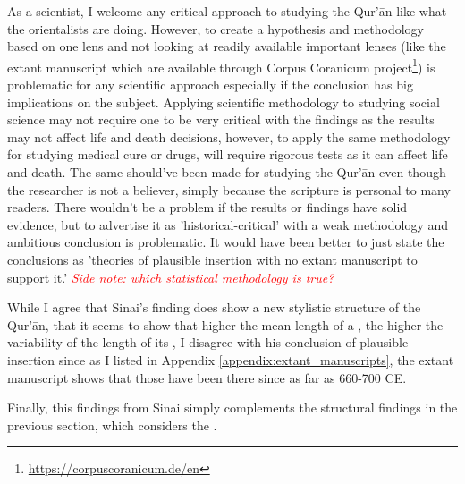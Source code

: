 As a scientist, I welcome any critical approach to studying the Qur'\=an like what the orientalists are doing. However, to create a hypothesis and methodology based on one lens and not looking at readily available important lenses (like the extant manuscript which are available through Corpus Coranicum project\footnote{\url{https://corpuscoranicum.de/en}}) is problematic for any scientific approach especially if the conclusion has big implications on the subject. Applying scientific methodology to studying social science may not require one to be very critical with the findings as the results may not affect life and death decisions, however, to apply the same methodology for studying medical cure or drugs, will require rigorous tests as it can affect life and death. The same should've been made for studying the Qur'\=an even though the researcher is not a believer, simply because the scripture is personal to many readers. There wouldn't be a problem if the results or findings have solid evidence, but to advertise it as 'historical-critical' with a weak methodology and ambitious conclusion is problematic. It would have been better to just state the conclusions as 'theories of plausible insertion with no extant manuscript to support it.' \textcolor{red}{\it Side note: which statistical methodology is true?}

While I agree that Sinai's finding does show a new stylistic structure of the Qur'\=an, that it seems to show that higher the mean   length of a  , the higher the variability of the length of its  , I disagree with his conclusion of plausible insertion since as I listed in Appendix \ref{appendix:extant_manuscripts}, the extant manuscript shows that those   have been there since as far as 660-700 CE.

Finally, this findings from Sinai simply complements the structural findings in the previous section, which considers the  .

